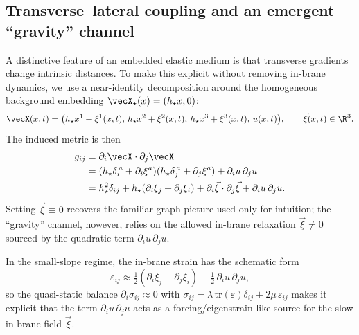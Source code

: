 \subsection{Transverse--lateral coupling and an emergent ``gravity'' channel}
\label{subsec:gravity-channel}

A distinctive feature of an embedded elastic medium is that transverse gradients change intrinsic distances.
To make this explicit without removing in-brane dynamics, we use a near-identity decomposition around the
homogeneous background embedding $\vecX_\star(x)=(h_\star x,0)$:
\begin{equation}
  \vecX(x,t)=\big(h_\star x^1+\xi^1(x,t),\,h_\star x^2+\xi^2(x,t),\,h_\star x^3+\xi^3(x,t),\,u(x,t)\big),
  \qquad \vec\xi(x,t)\in\R^3.
  \label{eq:near-identity-embedding}
\end{equation}
The induced metric is then
\begin{align}
  g_{ij}
  &= \partial_i\vecX\cdot\partial_j\vecX \nonumber\\
  &= (h_\star\delta_i^{\,a}+\partial_i\xi^a)(h_\star\delta_j^{\,a}+\partial_j\xi^a)+\partial_i u\,\partial_j u \nonumber\\
  &= h_\star^2\delta_{ij}+h_\star(\partial_i\xi_j+\partial_j\xi_i)+\partial_i\vec\xi\cdot\partial_j\vec\xi+\partial_i u\,\partial_j u.
  \label{eq:metric-near-identity}
\end{align}
Setting $\vec\xi\equiv 0$ recovers the familiar graph picture used only for intuition; the ``gravity'' channel,
however, relies on the allowed in-brane relaxation $\vec\xi\neq 0$ sourced by the quadratic term
$\partial_i u\,\partial_j u$.

In the small-slope regime, the in-brane strain has the schematic form
\begin{equation}
  \varepsilon_{ij}\approx \tfrac12(\partial_i\xi_j+\partial_j\xi_i)+\tfrac12\,\partial_i u\,\partial_j u,
  \label{eq:strain-near-identity}
\end{equation}
so the quasi-static balance $\partial_i\sigma_{ij}\approx 0$ with
$\sigma_{ij}=\lambda\,\mathrm{tr}(\varepsilon)\delta_{ij}+2\mu\,\varepsilon_{ij}$ makes it explicit that
the term $\partial_i u\,\partial_j u$ acts as a forcing/eigenstrain-like source for the slow in-brane field
$\vec\xi$.

